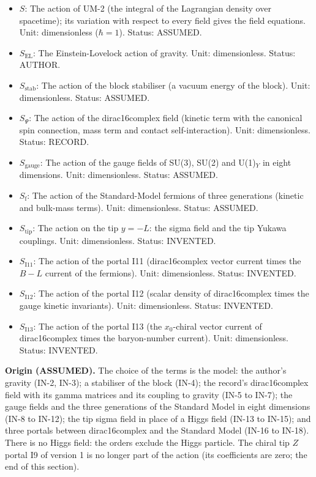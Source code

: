 \documentclass[
  10pt,
]{article}
\providecommand{\tightlist}{%
  \setlength{\itemsep}{0pt}\setlength{\parskip}{0pt}}
\begin{document}
\begin{itemize}
\tightlist
\item
  \(S\): The action of UM-2 (the integral of the Lagrangian density over
  spacetime); its variation with respect to every field gives the field
  equations. Unit: dimensionless (\(\hbar = 1\)). Status: ASSUMED.
\item
  \(S_{\mathrm{EL}}\): The Einstein-Lovelock action of gravity. Unit:
  dimensionless. Status: AUTHOR.
\item
  \(S_{\mathrm{stab}}\): The action of the block stabiliser (a vacuum
  energy of the block). Unit: dimensionless. Status: ASSUMED.
\item
  \(S_\Psi\): The action of the dirac16complex field (kinetic term with
  the canonical spin connection, mass term and contact
  self-interaction). Unit: dimensionless. Status: RECORD.
\item
  \(S_{\mathrm{gauge}}\): The action of the gauge fields of SU(3), SU(2)
  and U(1)\(_Y\) in eight dimensions. Unit: dimensionless. Status:
  ASSUMED.
\item
  \(S_{\mathrm{f}}\): The action of the Standard-Model fermions of three
  generations (kinetic and bulk-mass terms). Unit: dimensionless.
  Status: ASSUMED.
\item
  \(S_{\mathrm{tip}}\): The action on the tip \(y = -L\): the sigma
  field and the tip Yukawa couplings. Unit: dimensionless. Status:
  INVENTED.
\item
  \(S_{\mathrm{I11}}\): The action of the portal I11 (dirac16complex
  vector current times the \(B - L\) current of the fermions). Unit:
  dimensionless. Status: INVENTED.
\item
  \(S_{\mathrm{I12}}\): The action of the portal I12 (scalar density of
  dirac16complex times the gauge kinetic invariants). Unit:
  dimensionless. Status: INVENTED.
\item
  \(S_{\mathrm{I13}}\): The action of the portal I13 (the \(x_0\)-chiral
  vector current of dirac16complex times the baryon-number current).
  Unit: dimensionless. Status: INVENTED.
\end{itemize}

\textbf{Origin (ASSUMED).} The choice of the terms is the model: the
author's gravity (IN-2, IN-3); a stabiliser of the block (IN-4); the
record's dirac16complex field with its gamma matrices and its coupling
to gravity (IN-5 to IN-7); the gauge fields and the three generations of
the Standard Model in eight dimensions (IN-8 to IN-12); the tip sigma
field in place of a Higgs field (IN-13 to IN-15); and three portals
between dirac16complex and the Standard Model (IN-16 to IN-18). There is
no Higgs field: the orders exclude the Higgs particle. The chiral tip
\(Z\) portal I9 of version 1 is no longer part of the action (its
coefficients are zero; the end of this section).
\end{document}
